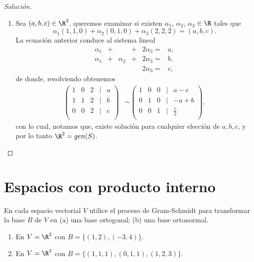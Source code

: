 \documentclass[a4,11pt]{aleph-notas}
\begin{document}
\begin{proof}[Solución]
\begin{enumerate}
        \item Sea $(a, b, c) \in \R^3$, queremos examinar si existen $\alpha_1$, $\alpha_2$, $\alpha_3$  $\in \R$ tales que  
        \[
        \alpha_{1} (1, 1, 0) + \alpha_{2} (0, 1, 0) + \alpha_{3} (2, 2, 2) =(a, b, c).
        \]
        La ecuación anterior conduce al sistema lineal
        \[
        \begin{array}{rrrrrrr}
         \alpha _{1} & + & & + & 2\alpha_{3} = & a, \\
         \alpha _{1} & + &\alpha_{2}& + &2\alpha_{3}= & b,\\
         & & & &2\alpha_{3}= & c,
         \end{array}
         \]
         de donde, resolviendo obtenemos
        \begin{align*}
        \begin{pmatrix}
            1&0&2&|&a\\
            1&1&2&|&b\\
            0&0&2&|&c\\
        \end{pmatrix}
        & \sim 
        \begin{pmatrix}
            1&0&0&|&a-c\\
            0&1&0&|&-a+b\\
            0&0&1&|&\frac{c}{2}\\
        \end{pmatrix},
        \end{align*}
        con lo cual, notamos que, existe solución para cualquier elección de $a, b, c$, y por lo tanto $\R^2 = gen (S)$. \qedhere
    \end{enumerate}
\end{proof}

\section{Espacios con producto interno}

\begin{ejer}
    En cada espacio vectorial $V$ utilice el proceso de Gram-Schmidt para transformar la base $B$ de $V$ en (a) una base ortogonal; (b) una base ortonormal.
    \begin{enumerate}
        \item En $V=\R^{2}$ con $B=\{(1, 2), (-3, 4)\}$.
        \item En $V=\R^{3}$ con $B=\{(1, 1, 1), (0, 1, 1), (1, 2, 3)\}$.
    \end{enumerate}
\end{ejer}
\end{document}
